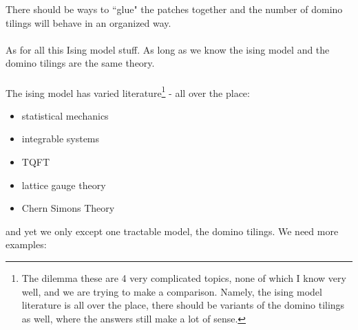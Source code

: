 \documentclass[12pt]{article}
\begin{document}
\noindent There should be ways to ``glue" the patches together and the number of domino tilings will behave in an organized way.  \\ \\
As for all this Ising model stuff.  As long as we know the ising model and the domino tilings are the same theory.  \\ \\The ising model has varied literature\footnote{The dilemma these are 4 very complicated topics, none of which I know very well, and we are trying to make a comparison.  Namely, the ising model literature is all over the place, there should be variants of the domino tilings as well, where the answers still make a lot of sense.} - all over the place:
\begin{itemize}
\item statistical mechanics
\item integrable systems
\item TQFT
\item lattice gauge theory
\item Chern Simons Theory
\end{itemize}
and yet we only except one tractable model, the domino tilings. We need more examples: \\
\end{document}
